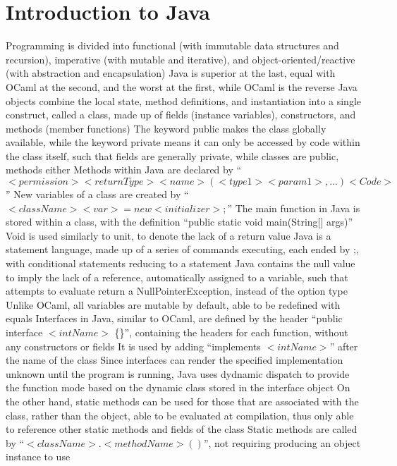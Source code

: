 \documentclass[11 pt, twoside]{article}
\newenvironment{outline*}
{
	\begin{outline}[enumerate]
	}
	{\end{outline}
}
\begin{document}
\section{Introduction to Java}
\begin{outline*}
\1 Programming is divided into functional (with immutable data structures and recursion), imperative (with mutable and iterative), and object-oriented/reactive (with abstraction and encapsulation)
	\2 Java is superior at the last, equal with OCaml at the second, and the worst at the first, while OCaml is the reverse
	\2 Java objects combine the local state, method definitions, and instantiation into a single construct, called a class, made up of fields (instance variables), constructors, and methods (member functions)
		\3 The keyword public makes the class globally available, while the keyword private means it can only be accessed by code within the class itself, such that fields are generally private, while classes are public, methods either
		\3 Methods within Java are declared by ``$<permission> <returnType> <name> (<type1> <param1>, ...) {<Code>}$''
		\3 New variables of a class are created by ``$<className> <var> = new <initializer>;$''
	\2 The main function in Java is stored within a class, with the definition ``public static void main(String[] args)''
		\3 Void is used similarly to unit, to denote the lack of a return value
\1 Java is a statement language, made up of a series of commands executing, each ended by ;, with conditional statements reducing to a statement
	\2 Java contains the null value to imply the lack of a reference, automatically assigned to a variable, such that attempts to evaluate return a NullPointerException, instead of the option type
	\2 Unlike OCaml, all variables are mutable by default, able to be redefined with equals
	\2 Interfaces in Java, similar to OCaml, are defined by the header ``public interface $<intName>$ \{\}'', containing the headers for each function, without any constructors or fields
		\3 It is used by adding ``implements $<intName>$'' after the name of the class
		\3 Since interfaces can render the specified implementation unknown until the program is running, Java uses dydnamic dispatch to provide the function mode based on the dynamic class stored in the interface object
			\4 On the other hand, static methods can be used for those that are associated with the class, rather than the object, able to be evaluated at compilation, thus only able to reference other static methods and fields of the class
			\4 Static methods are called by ``$<className>.<methodName>()$'', not requiring producing an object instance to use

\end{outline*}
\end{document}
